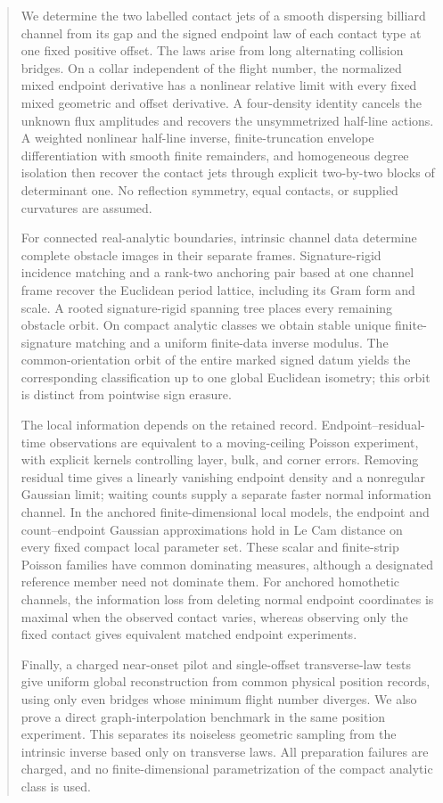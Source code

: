 \begin{abstract}
We determine the two labelled contact jets of a smooth dispersing billiard
channel from its gap and the signed endpoint law of each contact type at
one fixed positive offset.  The laws arise from long alternating collision
bridges.  On a collar independent of the flight number, the normalized
mixed endpoint derivative has a nonlinear relative limit with every fixed
mixed geometric and offset derivative.  A four-density identity cancels
the unknown flux amplitudes and recovers the unsymmetrized half-line
actions.  A weighted nonlinear half-line inverse, finite-truncation
envelope differentiation with smooth finite remainders, and homogeneous
degree isolation then recover the contact jets through explicit
two-by-two blocks of determinant one.  No reflection symmetry, equal
contacts, or supplied curvatures are assumed.

For connected real-analytic boundaries, intrinsic channel data determine
complete obstacle images in their separate frames.  Signature-rigid incidence
matching and a rank-two anchoring pair based at one channel frame recover
the Euclidean period lattice, including its Gram form and scale.  A rooted
signature-rigid spanning tree places every remaining obstacle orbit.  On compact analytic
classes we obtain stable unique finite-signature matching and a uniform
finite-data inverse modulus.  The common-orientation orbit of the entire
marked signed datum yields the corresponding classification up to one global
Euclidean isometry; this orbit is distinct from pointwise sign erasure.

The local information depends on the retained record.  Endpoint--residual-time
observations are equivalent to a moving-ceiling Poisson experiment, with
explicit kernels controlling layer, bulk, and corner errors.  Removing
residual time gives a linearly vanishing endpoint density and a nonregular
Gaussian limit; waiting counts supply a separate faster normal information
channel.  In the anchored finite-dimensional local models, the endpoint and
count--endpoint Gaussian approximations hold in Le Cam distance on every
fixed compact local parameter set.  These scalar and finite-strip Poisson
families have common dominating measures, although a designated reference
member need not dominate them.  For anchored homothetic channels, the
information loss from deleting normal endpoint coordinates is maximal when
the observed contact varies, whereas observing only the fixed contact gives
equivalent matched endpoint experiments.

Finally, a charged near-onset pilot and single-offset transverse-law tests
give uniform global reconstruction from common physical position records,
using only even bridges whose minimum flight number diverges.  We also prove
a direct graph-interpolation benchmark in the same position experiment.
This separates its noiseless geometric sampling from the intrinsic inverse
based only on transverse laws.  All preparation failures are charged, and
no finite-dimensional parametrization of the compact analytic class is used.
\end{abstract}
